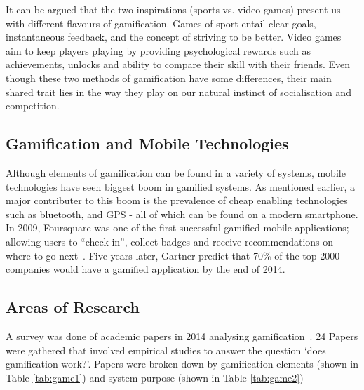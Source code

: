 It can be argued that the two inspirations (sports vs. video games) present us with different flavours of gamification. Games of sport entail clear goals, instantaneous feedback, and the concept of striving to be better. Video games aim to keep players playing by providing psychological rewards such as achievements, unlocks and ability to compare their skill with their friends. Even though these two methods of gamification have some differences, their main shared trait lies in the way they play on our natural instinct of socialisation and competition. ~\cite{grove2011gamification}

\subsection{Gamification and Mobile Technologies}
Although elements of gamification can be found in a variety of systems, mobile technologies have seen biggest boom in gamified systems. As mentioned earlier, a major contributer to this boom is the prevalence of cheap enabling technologies such as bluetooth, and GPS - all of which can be found on a modern smartphone. In 2009, Foursquare was one of the first successful gamified mobile applications; allowing users to ``check-in'', collect badges and receive recommendations on where to go next~\cite{zichermann2011gamification}. Five years later, Gartner predict that 70\% of the top 2000 companies would have a gamified application by the end of 2014.~\cite{gartner70}

\subsection{Areas of Research}
A survey was done of academic papers in 2014 analysing gamification~\cite{gamificationlit}. 24 Papers were gathered that involved empirical studies to answer the question `does gamification work?'. Papers were broken down by gamification elements (shown in Table \ref{tab:game1}) and system purpose (shown in Table \ref{tab:game2})

